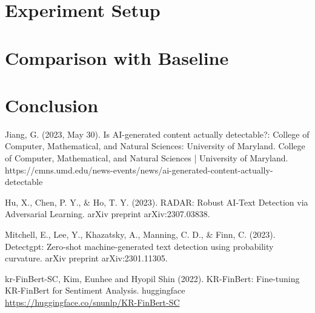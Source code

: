 \documentclass{article}
\begin{document}
\section{Experiment Setup}

\section{Comparison with Baseline}

\section{Conclusion}



Jiang, G. (2023, May 30). Is AI-generated content actually detectable?: College of Computer, Mathematical, and Natural Sciences: University of Maryland. College of Computer, Mathematical, and Natural Sciences | University of Maryland. https://cmns.umd.edu/news-events/news/ai-generated-content-actually-detectable 

Hu, X., Chen, P. Y., \& Ho, T. Y. (2023). RADAR: Robust AI-Text Detection via Adversarial Learning. arXiv preprint arXiv:2307.03838.

Mitchell, E., Lee, Y., Khazatsky, A., Manning, C. D., \& Finn, C. (2023). Detectgpt: Zero-shot machine-generated text detection using probability curvature. arXiv preprint arXiv:2301.11305.

kr-FinBert-SC, Kim, Eunhee and Hyopil Shin (2022). KR-FinBert: Fine-tuning KR-FinBert for Sentiment Analysis. huggingface \url{https://huggingface.co/snunlp/KR-FinBert-SC}
\end{document}
